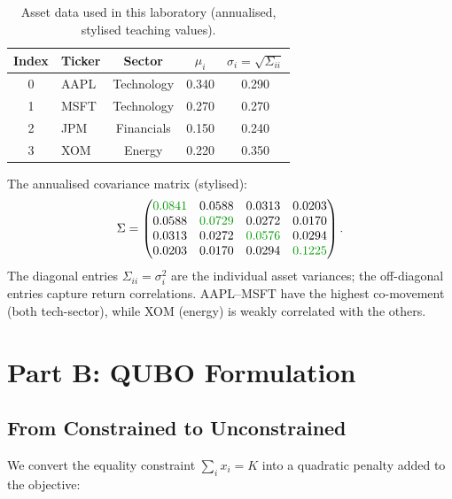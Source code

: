 \documentclass[a4paper,11pt]{article}
\newcommand{\cgr}[1]{\textcolor{codegreen}{#1}}
\begin{document}
\begin{table}[H]
\centering
\caption{Asset data used in this laboratory (annualised, stylised teaching values).}
\label{tab:assets}
\begin{tabular}{clccc}
    \toprule
    Index & Ticker & Sector & $\mu_i$ & $\sigma_i = \sqrt{\Sigma_{ii}}$ \\
    \midrule
    0 & AAPL  & Technology    & 0.340 & 0.290 \\
    1 & MSFT  & Technology    & 0.270 & 0.270 \\
    2 & JPM   & Financials    & 0.150 & 0.240 \\
    3 & XOM   & Energy        & 0.220 & 0.350 \\
    \bottomrule
\end{tabular}
\end{table}

\noindent The annualised covariance matrix (stylised):
\begin{equation}
    \Sigma = \begin{pmatrix}
        \cgr{0.0841} & 0.0588 & 0.0313 & 0.0203 \\
        0.0588 & \cgr{0.0729} & 0.0272 & 0.0170 \\
        0.0313 & 0.0272 & \cgr{0.0576} & 0.0294 \\
        0.0203 & 0.0170 & 0.0294 & \cgr{0.1225}
    \end{pmatrix}.
    \label{eq:sigma}
\end{equation}
The diagonal entries $\Sigma_{ii} = \sigma_i^2$ are the individual asset
variances; the off-diagonal entries capture return correlations.
AAPL--MSFT have the highest co-movement (both tech-sector), while
XOM (energy) is weakly correlated with the others.

\section{Part B: QUBO Formulation}

\subsection{From Constrained to Unconstrained}

We convert the equality constraint $\sum_i x_i = K$ into a quadratic
penalty added to the objective:
\end{document}
